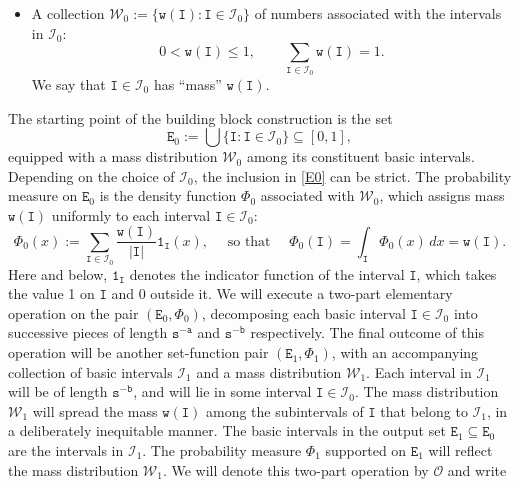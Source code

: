 \documentclass[12pt, twoside]{article}
\theoremstyle{definition}
\numberwithin{equation}{section}
\begin{document}
\begin{itemize}
\begin{align}
|\mathtt I| &= \mathtt t^{-1} \leq 1 \; \text{ and } \;    
\text{int}(\mathtt I) \cap \text{int}(\mathtt I') = \emptyset \; \text{ for all } \mathtt I, \mathtt I' \in \mathscr{I}_0, \; \mathtt I \ne \mathtt I'.   \label{I0-2}
\end{align} 
The number of intervals in $\mathscr{I}_0$ could be strictly less than $\mathtt t$. Throughout this paper and for a measurable set $\mathtt U \subseteq \mathbb R$, the symbol $|\mathtt U|$ will refer to its Lebesgue measure. 
\item A collection $\mathscr{W}_0 := \bigl\{\mathtt w(\mathtt I) : \mathtt I \in \mathscr{I}_0  \bigr\}$ of numbers associated with the intervals in $\mathscr{I}_0$: 
\begin{equation} \label{weights}
0 < \mathtt w(\mathtt I) \leq 1, \qquad \sum_{\mathtt I \in \mathscr{I}_0} \mathtt w(\mathtt I) = 1. 
\end{equation} 
We say that $\mathtt I \in \mathscr{I}_0$ has ``mass'' $\mathtt w(\mathtt I)$. 
\end{itemize} 
The starting point of the building block construction is the set  
\begin{equation} \label{E0}
\mathtt E_0 := \bigcup \bigl\{\mathtt I : \mathtt I \in \mathscr{I}_0 \bigr\} \subseteq [0, 1],
\end{equation} 
equipped with a mass distribution $\mathscr{W}_0$ among its constituent basic intervals. Depending on the choice of $\mathscr{I}_0$, the inclusion in \eqref{E0} can be strict. The probability measure on $\mathtt E_0$ is the density function $\Phi_0$ associated with $\mathscr{W}_0$, which assigns mass $\mathtt w(\mathtt I)$ uniformly to each interval $\mathtt I \in \mathscr{I}_0$: 
\begin{equation} \label{Phi0}
  \Phi_0 (x)  := \sum_{\mathtt I \in \mathscr{I}_0} \frac{\mathtt w(\mathtt I)}{|\mathtt I|} \mathtt 1_{\mathtt I}(x), \quad \text{ so that } \quad \Phi_0(\mathtt I) = \int_{\mathtt I} \Phi_0(x) \, dx = \mathtt w(\mathtt I).  
\end{equation} 
Here and below, $\mathtt 1_{\mathtt I}$ denotes the indicator function of the interval $\mathtt I$, which takes the value 1 on $\mathtt I$ and 0 outside it. 
\vskip0.1in 
\noindent We will execute a two-part elementary operation on the pair $(\mathtt E_0, \Phi_0)$, decomposing each basic interval $\mathtt I \in \mathscr{I}_0$ into successive pieces of length $\mathtt s^{-\mathtt a}$ and $\mathtt s^{-\mathtt b}$ respectively. The final outcome of this operation will be another set-function pair $(\mathtt E_1, \Phi_1)$, with an accompanying collection of basic intervals $\mathscr{I}_1$ and a mass distribution $\mathscr{W}_1$. Each interval in $\mathscr{I}_1$ will be of length $\mathtt s^{-\mathtt b}$, and will lie in some interval $\mathtt I \in \mathscr{I}_0$. The mass distribution $\mathscr{W}_1$ will spread the mass $\mathtt w(\mathtt I)$ among the subintervals of $\mathtt I$ that belong to $\mathscr{I}_1$, in a deliberately inequitable manner. The basic intervals in the output set $\mathtt E_1 \subseteq \mathtt E_0$ are the intervals in $\mathscr{I}_1$. The probability measure $\Phi_1$ supported on $\mathtt E_1$ will reflect the mass distribution $\mathscr{W}_1$.  We will denote this two-part operation by $\mathscr{O}$ and write
\end{document}

